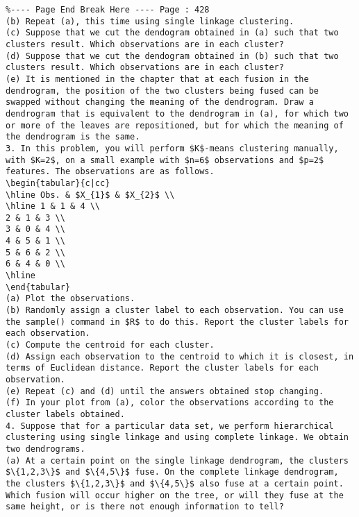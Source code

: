 \documentclass[10pt]{article}
\begin{document}
\begin{verbatim}
%---- Page End Break Here ---- Page : 428
(b) Repeat (a), this time using single linkage clustering.
(c) Suppose that we cut the dendogram obtained in (a) such that two clusters result. Which observations are in each cluster?
(d) Suppose that we cut the dendogram obtained in (b) such that two clusters result. Which observations are in each cluster?
(e) It is mentioned in the chapter that at each fusion in the dendrogram, the position of the two clusters being fused can be swapped without changing the meaning of the dendrogram. Draw a dendrogram that is equivalent to the dendrogram in (a), for which two or more of the leaves are repositioned, but for which the meaning of the dendrogram is the same.
3. In this problem, you will perform $K$-means clustering manually, with $K=2$, on a small example with $n=6$ observations and $p=2$ features. The observations are as follows.
\begin{tabular}{c|cc}
\hline Obs. & $X_{1}$ & $X_{2}$ \\
\hline 1 & 1 & 4 \\
2 & 1 & 3 \\
3 & 0 & 4 \\
4 & 5 & 1 \\
5 & 6 & 2 \\
6 & 4 & 0 \\
\hline
\end{tabular}
(a) Plot the observations.
(b) Randomly assign a cluster label to each observation. You can use the sample() command in $R$ to do this. Report the cluster labels for each observation.
(c) Compute the centroid for each cluster.
(d) Assign each observation to the centroid to which it is closest, in terms of Euclidean distance. Report the cluster labels for each observation.
(e) Repeat (c) and (d) until the answers obtained stop changing.
(f) In your plot from (a), color the observations according to the cluster labels obtained.
4. Suppose that for a particular data set, we perform hierarchical clustering using single linkage and using complete linkage. We obtain two dendrograms.
(a) At a certain point on the single linkage dendrogram, the clusters $\{1,2,3\}$ and $\{4,5\}$ fuse. On the complete linkage dendrogram, the clusters $\{1,2,3\}$ and $\{4,5\}$ also fuse at a certain point. Which fusion will occur higher on the tree, or will they fuse at the same height, or is there not enough information to tell?


\end{verbatim}
\end{document}
